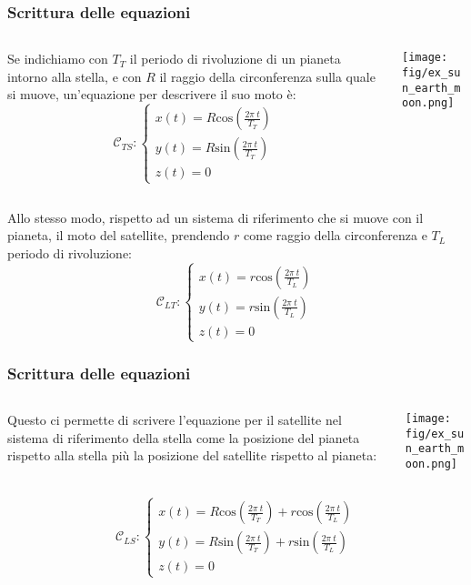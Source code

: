 \documentclass{beamer}
\newcommand{\fig}{figures} %
\newcommand{\msin}{\mbox{sin}} %
\newcommand{\mcos}{\mbox{cos}} %
\begin{document}
\begin{frame}
\frametitle{Scrittura delle equazioni}

\begin{columns}
\begin{column}{0.5\textwidth}
Se indichiamo con $T_T$ il periodo di rivoluzione di un pianeta intorno alla stella, e con $R$ il raggio della circonferenza sulla quale si muove, un'equazione per descrivere il suo moto \`e:
\begin{displaymath}
\mathcal{C}_{TS}:\begin{cases}
 x(t)= R \mcos(\frac{2\pi~t}{T_T})\\
 y(t)= R \msin(\frac{2\pi~t}{T_T})\\
 z(t)= 0
\end{cases}
\end{displaymath}
\end{column}
\begin{column}{0.5\textwidth}
\texttt{[image: \\fig/ex\_sun\_earth\_moon.png]}
\end{column}
\end{columns}
Allo stesso modo, rispetto ad un sistema di riferimento che si muove con il
pianeta, il moto del satellite, prendendo $r$ come raggio della circonferenza e
$T_L$ periodo di rivoluzione:
\begin{displaymath}
\mathcal{C}_{LT}:\begin{cases}
 x(t)= r \mcos(\frac{2\pi~t}{T_L})\\
 y(t)= r \msin(\frac{2\pi~t}{T_L})\\
 z(t)= 0
\end{cases}
\end{displaymath}
\end{frame}
\begin{frame}
\frametitle{Scrittura delle equazioni}

\begin{columns}
\begin{column}{0.5\textwidth}
Questo ci permette di scrivere l'equazione per il satellite nel sistema di riferimento della stella come la posizione del pianeta rispetto alla stella  pi\`u la posizione del satellite rispetto al pianeta:
\end{column}
\begin{column}{0.5\textwidth}
\texttt{[image: \\fig/ex\_sun\_earth\_moon.png]}
\end{column}
\end{columns}
\begin{displaymath}
\mathcal{C}_{LS}:\begin{cases}
 x(t)=  R \mcos(\frac{2\pi~t}{T_T}) + r \mcos(\frac{2\pi~t}{T_L})\\
 y(t)=  R \msin(\frac{2\pi~t}{T_T}) + r \msin(\frac{2\pi~t}{T_L})\\
 z(t)= 0
\end{cases}
\end{displaymath}
\end{frame}
\end{document}
